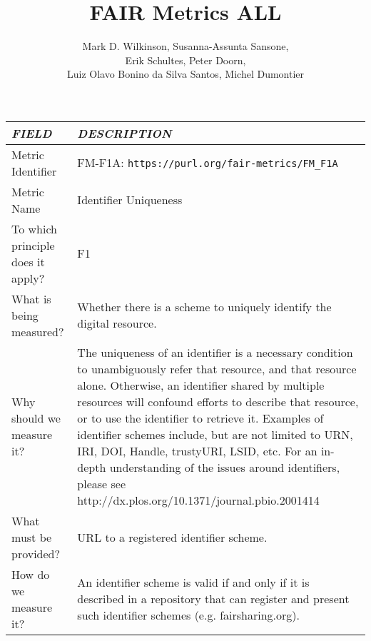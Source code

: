\documentclass[english]{article}
\begin{document}
\title{FAIR Metrics ALL}

\author{Mark D. Wilkinson, Susanna-Assunta Sansone, \\Erik Schultes, Peter Doorn,\\ 
Luiz Olavo Bonino da Silva Santos, Michel Dumontier}

\maketitle

\newpage


\thispagestyle{fancy}


\centering

\begin{longtable}{|p{5cm}|p{9cm}|}
\hline
\emph{FIELD} & \emph{DESCRIPTION} \\
\hline
Metric Identifier &   FM-F1A: \verb"https://purl.org/fair-metrics/FM_F1A"
 \\


\hline
Metric Name &   Identifier Uniqueness \\



\hline
To which principle does it apply? &   F1\\



\hline
What is being measured? & Whether there is a scheme to uniquely identify the digital resource.\\



\hline
Why should we measure it? & 
The uniqueness of an identifier is a necessary condition to unambiguously refer that resource, and that resource alone. Otherwise, an identifier shared by multiple resources will confound efforts to describe that resource, or to use the identifier to retrieve it. Examples of identifier schemes include, but are not limited to URN, IRI, DOI, Handle, trustyURI, LSID, etc. For an in-depth understanding of the issues around identifiers, please see http://dx.plos.org/10.1371/journal.pbio.2001414  
\\



\hline
What must be provided? &  URL to a registered identifier scheme. \\



\hline
How do we measure it? &  
An identifier scheme is valid if and only if it is described in a repository that can register and present such identifier schemes (e.g. fairsharing.org). \newline
\newline


\end{longtable}
\end{document}
